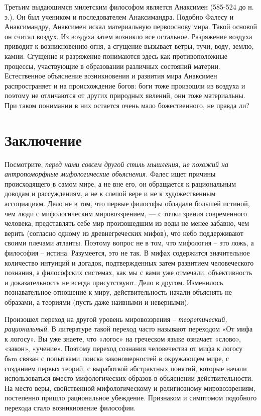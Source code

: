 Третьим выдающимся милетским философом является Анаксимен (585-524 до н.
э.). Он был учеником и последователем Анаксимандра. Подобно Фалесу и
Анаксимандру, Анаксимен искал материальную первооснову мира. Такой
основой он считал воздух. Из воздуха затем возникло все остальное.
Разряжение воздуха приводит к возникновению огня, а сгущение вызывает
ветры, тучи, воду, землю, камни. Сгущение и разряжение понимаются здесь
как противоположные процессы, участвующие в образовании различных
состояний материи. Естественное объяснение возникновения и развития мира
Анаксимен распространяет и на происхождение богов: боги тоже произошли
из воздуха и поэтому не отличаются от других природных явлений, они тоже
материальны. При таком понимании в них остается очень мало
божественного, не правда ли?


\section{Заключение}

Посмотрите, \emph{перед нами совсем другой стиль мышления, не похожий на
  антропоморфные мифологические объяснения.} Фалес ищет причины
происходящего в самом мире, а не вне его, он обращается к рациональным
доводам и рассуждениям, а не к слепой вере и не к художественным
ассоциациям. Дело не в том, что первые философы обладали большей
истиной, чем люди с мифологическим мировоззрением, --- с точки зрения
современного человека, представлять себе мир произошедшим из воды не
менее забавно, чем верить (согласно одному из древнегреческих мифов),
что небо поддерживают своими плечами атланты. Поэтому вопрос не в том,
что мифология -- это ложь, а философия -- истина. Разумеется, это не
так. В мифах содержится значительное количество интуиций и догадок,
подтвержденных затем развитием человеческого познания, а философских
системах, как мы с вами уже отмечали, объективность и доказательность не
всегда присутствуют. Дело в другом. Изменилось познавательное отношение
к миру, действительность начали объяснять не образами, а теориями (пусть
даже наивными и неверными).

Произошел переход на другой уровень мировоззрения --
\emph{теоретический, рациональный}. В литературе такой переход часто
называют переходом «От мифа к логосу». Вы уже знаете, что «логос» на
греческом языке означает «слово», «закон», «учение». Поэтому переход
сознания человечества от мифа к логосу бьm связан с попытками поиска
закономерностей в окружающем мире, с созданием первых теорий, с
выработкой абстрактных понятий, которые начали использоваться вместо
мифологических образов в объяснении действительности. На место веры,
свойственной мифологическому и религиозному мировоззрениям, постепенно
пришло рациональное убеждение. Признаком и симптомом подобного перехода
стало возникновение философии.

